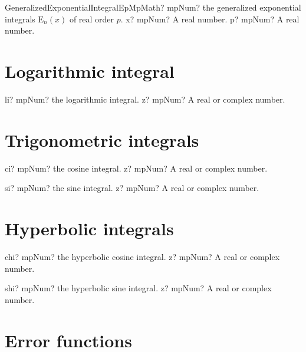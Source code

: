 \documentclass[12pt,a4paper,openany]{book}
\begin{document}
\begin{mpFunctionsExtract}
\mpFunctionTwoNotImplemented
{GeneralizedExponentialIntegralEpMpMath? mpNum? the generalized exponential integrals $\text{E}_n(x)$ of real order $p$.}
{x? mpNum? A real number.}
{p? mpNum? A real number.}
\end{mpFunctionsExtract}

\section{Logarithmic integral}

\begin{mpFunctionsExtract}
\mpFunctionOne
{li? mpNum? the logarithmic integral.}
{z? mpNum? A real or complex number.}
\end{mpFunctionsExtract}

\section{Trigonometric integrals}

\begin{mpFunctionsExtract}
\mpFunctionOne
{ci? mpNum? the cosine integral.}
{z? mpNum? A real or complex number.}
\end{mpFunctionsExtract}

\begin{mpFunctionsExtract}
\mpFunctionOne
{si? mpNum? the sine integral.}
{z? mpNum? A real or complex number.}
\end{mpFunctionsExtract}

\section{Hyperbolic integrals}

\begin{mpFunctionsExtract}
\mpFunctionOne
{chi? mpNum? the hyperbolic cosine integral.}
{z? mpNum? A real or complex number.}
\end{mpFunctionsExtract}

\begin{mpFunctionsExtract}
\mpFunctionOne
{shi? mpNum? the hyperbolic sine integral.}
{z? mpNum? A real or complex number.}
\end{mpFunctionsExtract}

\section{Error functions}
\end{document}
